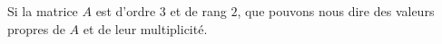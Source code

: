 
\begin{exercice}\label{exoexoMatrices-0001}

	Si la matrice $A$ est d'ordre $3$ et de rang $2$, que pouvons nous dire des valeurs propres de $A$ et de leur multiplicité.

\end{exercice}
